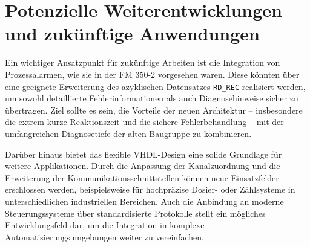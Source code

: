 \section{Potenzielle Weiterentwicklungen und zukünftige Anwendungen}

Ein wichtiger Ansatzpunkt für zukünftige Arbeiten ist die Integration von Prozessalarmen, wie sie in der FM 350-2 vorgesehen waren. Diese könnten über eine geeignete Erweiterung des azyklischen Datensatzes \texttt{RD\_REC} realisiert werden, um sowohl detaillierte Fehlerinformationen als auch Diagnosehinweise sicher zu übertragen. Ziel sollte es sein, die Vorteile der neuen Architektur – insbesondere die extrem kurze Reaktionszeit und die sichere Fehlerbehandlung – mit der umfangreichen Diagnosetiefe der alten Baugruppe zu kombinieren.  

Darüber hinaus bietet das flexible VHDL-Design eine solide Grundlage für weitere Applikationen. Durch die Anpassung der Kanalzuordnung und die Erweiterung der Kommunikationsschnittstellen können neue Einsatzfelder erschlossen werden, beispielsweise für hochpräzise Dosier- oder Zählsysteme in unterschiedlichen industriellen Bereichen. Auch die Anbindung an moderne Steuerungssysteme über standardisierte Protokolle stellt ein mögliches Entwicklungsfeld dar, um die Integration in komplexe Automatisierungsumgebungen weiter zu vereinfachen.  
